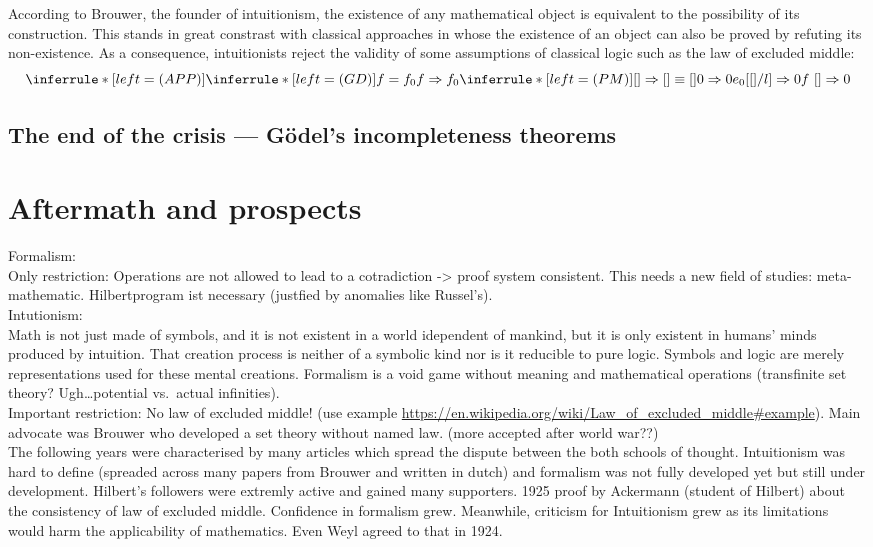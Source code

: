 \documentclass[hidelinks]{article}
\theoremstyle{plain}
\theoremstyle{definition}
\theoremstyle{rem}
\begin{document}
According to Brouwer, the founder of intuitionism, the existence of any mathematical object is equivalent to the possibility of its construction.
This stands in great constrast with classical approaches in whose the existence of an object can also be proved by refuting its non-existence. As a consequence, intuitionists reject the validity of some assumptions of classical logic such as the law of excluded middle:
\[
\inferrule*[left=(APP)]{
	\inferrule*[left=(GD)]
	{
		{f=f_0}
	}
	{f\Rightarrow f_0}
	\inferrule*[left=(PM)]
	{
		{[]\Rightarrow[]\equiv[]}\\
		{0\Rightarrow 0}
	}
	{e_0[[]/l]\Rightarrow 0}
}
{f\ []\Rightarrow 0}
\]

\subsection{The end of the crisis --- Gödel's incompleteness theorems}\label{ssec_end_crisis}\label{ssec_goedel}

\section{Aftermath and prospects}

Formalism:\\
Only restriction: Operations are not allowed to lead to a cotradiction -> proof system consistent. This needs a new field of studies: meta-mathematic. Hilbertprogram ist necessary (justfied by anomalies like Russel's).\\

Intutionism:\\
Math is not just made of symbols, and it is not existent in a world idependent of mankind, but it is only existent in humans' minds produced by intuition. That creation process is neither of a symbolic kind nor is it reducible to pure logic. Symbols and logic are merely representations used for these mental creations. Formalism is a void game without meaning and mathematical operations (transfinite set theory? Ugh\ldots potential vs.\ actual infinities).\\
Important restriction: No law of excluded middle! (use example \url{https://en.wikipedia.org/wiki/Law\_of\_excluded\_middle#example}). Main advocate was Brouwer who developed a set theory without named law. (more accepted after world war??)\\


The following years were characterised by many articles which spread the dispute between the both schools of thought. Intuitionism was hard to define (spreaded across many papers from Brouwer and written in dutch) and formalism was not fully developed yet but still under development. Hilbert's followers were extremly active and gained many supporters. 1925 proof by Ackermann (student of Hilbert) about the consistency of law of excluded middle. Confidence in formalism grew. Meanwhile, criticism for Intuitionism grew as its limitations would harm the applicability of mathematics. Even Weyl agreed to that in 1924.\\
\end{document}
